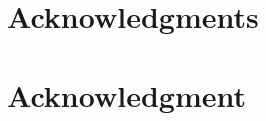 \documentclass[10pt,journal,compsoc]{IEEEtran}
\begin{document}
	
	
	
	
	
	
	
	
	\appendices
	
	
	
	
	
	\ifCLASSOPTIONcompsoc
	\section*{Acknowledgments}
	\else
	\section*{Acknowledgment}
	\fi
	
\end{document}
